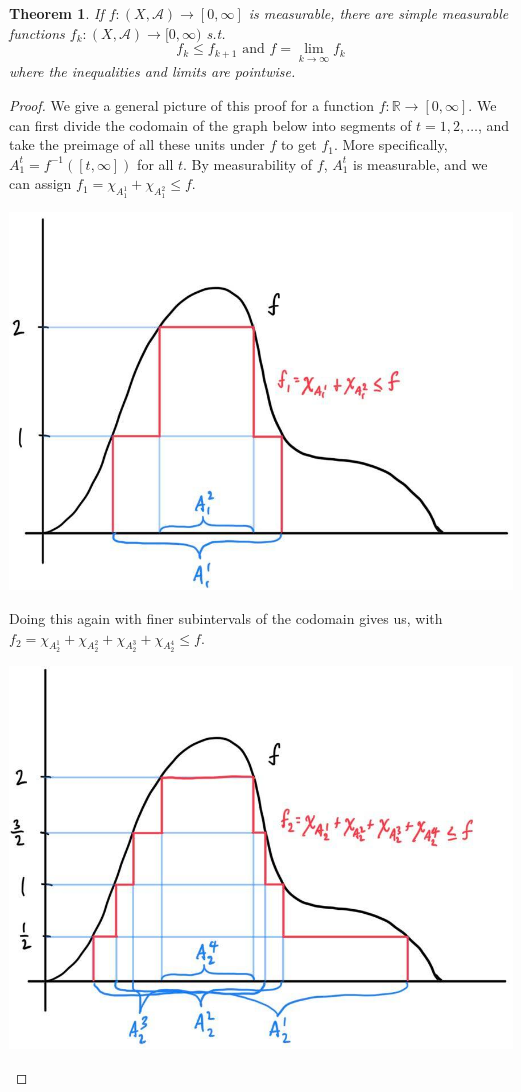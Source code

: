 \documentclass{article}
\newtheorem{theorem}{Theorem}[section]
\theoremstyle{remark}
\theoremstyle{definition}
\begin{document}
\begin{theorem}
If $f: (X, \mathcal{A}) \longrightarrow [0, \infty]$ is measurable, there are simple measurable functions $f_k : (X, \mathcal{A}) \longrightarrow [0, \infty)$ s.t. 
\[f_k \leq f_{k+1} \text{ and } f = \lim_{k \rightarrow \infty} f_k\]
where the inequalities and limits are pointwise. 
\end{theorem}
\begin{proof}
We give a general picture of this proof for a function $f: \mathbb{R} \longrightarrow [0, \infty]$. We can first divide the codomain of the graph below into segments of $t = 1, 2, \ldots$, and take the preimage of all these units under $f$ to get $f_1$. More specifically, $A_1^t = f^{-1} ([t, \infty])$ for all $t$. By measurability of $f$, $A_1^t$ is measurable, and we can assign $f_1 = \chi_{A^1_1} + \chi_{A_1^2} \leq f$. 
\begin{center}
    \includegraphics[scale=0.23]{img/Lebesgue_1.jpg}
\end{center}
Doing this again with finer subintervals of the codomain gives us, with $f_2 = \chi_{A_2^1} + \chi_{A_2^2} + \chi_{A_2^3} + \chi_{A_2^4} \leq f$. 
\begin{center}
    \includegraphics[scale=0.23]{img/Lebesgue_2.jpg}

\end{center}
\end{proof}
\end{document}
